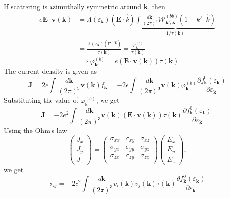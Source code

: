 \documentclass{article}
\begin{document}
If scattering is azimuthally symmetric around \textbf{k}, then
\begin{align*}
	e\mathbf{E} \cdot \mathbf{v}(\mathbf{k}) &= \Lambda(\varepsilon_{\mathbf{k}}) (\mathbf{E} \cdot \hat{k}) \underbrace{\int \frac{d\mathbf{k'}}{(2\pi)^3} \mathcal{W}_{\mathbf{k'},\mathbf{k}}^{(bb)} (1 - \hat{k'} \cdot \hat{k}  )}_{1/\tau(\mathbf{k})}\\
	&= \frac{\Lambda(\varepsilon_{\mathbf{k}}) (\mathbf{E} \cdot \hat{k}) }{\tau(\mathbf{k})} = \frac{\varphi_{\mathbf{k}}^{(b)}}{\tau(\mathbf{k})}
\end{align*}
\begin{equation}
	\implies \varphi_{\mathbf{k}}^{(b)} = e(\mathbf{E} \cdot \mathbf{v}(\mathbf{k}))\tau(\mathbf{k})
\end{equation}
The current density is given as 
\begin{equation}
	\mathbf{J} = 2e \int \frac{d\mathbf{k}}{(2\pi)^3} \mathbf{v}(\mathbf{k}) f_{\mathbf{k}}  = -2e \int \frac{d\mathbf{k}}{(2\pi)^3} \mathbf{v}(\mathbf{k}) \varphi_{\mathbf{k}}^{(b)} \frac{\partial f_{\mathbf{k}}^0 (\varepsilon_\mathbf{k})}{\partial \varepsilon_\mathbf{k}} 
\end{equation}
Substituting the value of $\varphi_{\mathbf{k}}^{(b)}$, we get
\begin{equation}
	\mathbf{J} = -2e^2 \int \frac{d\mathbf{k}}{(2\pi)^3} \mathbf{v}(\mathbf{k}) (\mathbf{E} \cdot \mathbf{v}(\mathbf{k}))\tau(\mathbf{k}) \frac{\partial f_{\mathbf{k}}^0 (\varepsilon_\mathbf{k})}{\partial \varepsilon_\mathbf{k}}.
\end{equation}
Using the Ohm's law 
\begin{equation}
	\begin{pmatrix}
		J_x \\ J_y\\ J_z
	\end{pmatrix} =
	\begin{pmatrix}
		\sigma_{xx} & \sigma_{xy} & \sigma_{xz}\\
		\sigma_{yx} & \sigma_{yy} & \sigma_{yz}\\
		\sigma_{zx} & \sigma_{zy} & \sigma_{zz}\\
	\end{pmatrix} \begin{pmatrix}
		E_x \\ E_y\\ E_z
	\end{pmatrix},
\end{equation}
we get
\begin{equation}
	\sigma_{ij} = -2e^2 \int \frac{d\mathbf{k}}{(2\pi)^3} v_i(\mathbf{k}) v_j(\mathbf{k}) 
	\tau(\mathbf{k}) \frac{\partial f_{\mathbf{k}}^0 (\varepsilon_\mathbf{k})}{\partial \varepsilon_\mathbf{k}} 
\end{equation}
\end{document}
